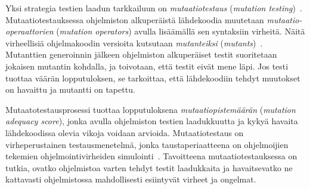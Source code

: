\documentclass[finnish]{tktltiki2}
\theoremstyle{definition}
\theoremstyle{remark}
\begin{document}
Yksi strategia testien laadun tarkkailuun on \textit{mutaatiotestaus} (\textit{mutation testing})~\cite{tähänalkuperäinenlähdemutaatiotestaukselle}. Mutaatiotestauksessa ohjelmiston alkuperäistä lähdekoodia muutetaan \textit{mutaatio-operaattorien} (\textit{mutation operators}) avulla lisäämällä sen syntaksiin virheitä. Näitä virheellisiä ohjelmakoodin versioita kutsutaan \textit{mutanteiksi} (\textit{mutants})~\cite{Ma:Harrold:Kwon:2006}. Mutanttien generoinnin jälkeen ohjelmiston alkuperäiset testit suoritetaan jokaisen mutantin kohdalla, ja toivotaan, että testit eivät mene läpi. Jos testi tuottaa väärän lopputuloksen, se tarkoittaa, että lähdekoodiin tehdyt muutokset on havaittu ja mutantti on tapettu. 

Mutaatotestausprosessi tuottaa lopputuloksena \textit{mutaatiopistemäärän} (\textit{mutation adequacy score}), jonka avulla ohjelmiston testien laadukkuutta ja kykyä havaita lähdekoodissa olevia vikoja voidaan arvioida. Mutaatiotestaus on virheperustainen testausmenetelmä, jonka taustaperiaatteena on ohjelmoijien tekemien ohjelmointivirheiden simulointi~\cite{Jia:Harman:2011}. Tavoitteena mutaatiotestauksessa on tutkia, ovatko ohjelmistoa varten tehdyt testit laadukkaita ja havaitsevatko ne kattavasti ohjelmistossa mahdollisesti esiintyvät virheet ja ongelmat. 


%
%
\newpage

%

%





% 
\end{document}
